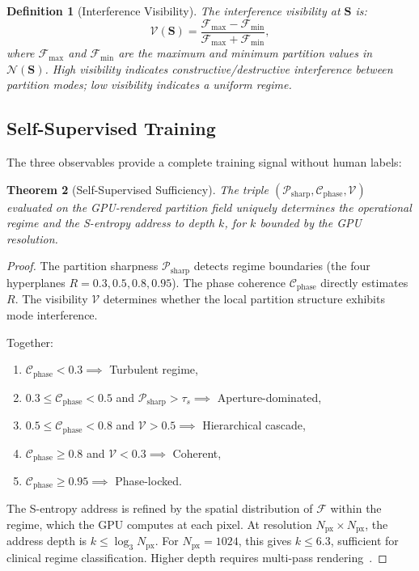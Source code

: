 \documentclass[aps,prd,twocolumn,superscriptaddress,floatfix,nofootinbib]{revtex4-2}
\newtheorem{theorem}{Theorem}[section]
\newtheorem{definition}[theorem]{Definition}
\theoremstyle{remark}
\newcommand{\Svec}{\mathbf{S}}
\begin{document}
\begin{definition}[Interference Visibility]
\label{def:visibility}
The interference visibility at $\Svec$ is:
\begin{equation}
\mathcal{V}(\Svec) = \frac{\mathcal{F}_{\max} - \mathcal{F}_{\min}}{\mathcal{F}_{\max} + \mathcal{F}_{\min}},
\label{eq:visibility}
\end{equation}
where $\mathcal{F}_{\max}$ and $\mathcal{F}_{\min}$ are the maximum and minimum partition values in $\mathcal{N}(\Svec)$.
High visibility indicates constructive/destructive interference between partition modes; low visibility indicates a uniform regime.
\end{definition}

\subsection{Self-Supervised Training}

The three observables provide a complete training signal without human labels:

\begin{theorem}[Self-Supervised Sufficiency]
\label{thm:self_supervised}
The triple $(\mathcal{P}_{\mathrm{sharp}}, \mathcal{C}_{\mathrm{phase}}, \mathcal{V})$ evaluated on the GPU-rendered partition field uniquely determines the operational regime and the S-entropy address to depth $k$, for $k$ bounded by the GPU resolution.
\end{theorem}

\begin{proof}
The partition sharpness $\mathcal{P}_{\mathrm{sharp}}$ detects regime boundaries (the four hyperplanes $R = 0.3, 0.5, 0.8, 0.95$).
The phase coherence $\mathcal{C}_{\mathrm{phase}}$ directly estimates $R$.
The visibility $\mathcal{V}$ determines whether the local partition structure exhibits mode interference.

Together:
\begin{enumerate}[noitemsep]
    \item $\mathcal{C}_{\mathrm{phase}} < 0.3 \implies$ Turbulent regime,
    \item $0.3 \leq \mathcal{C}_{\mathrm{phase}} < 0.5$ and $\mathcal{P}_{\mathrm{sharp}} > \tau_s \implies$ Aperture-dominated,
    \item $0.5 \leq \mathcal{C}_{\mathrm{phase}} < 0.8$ and $\mathcal{V} > 0.5 \implies$ Hierarchical cascade,
    \item $\mathcal{C}_{\mathrm{phase}} \geq 0.8$ and $\mathcal{V} < 0.3 \implies$ Coherent,
    \item $\mathcal{C}_{\mathrm{phase}} \geq 0.95 \implies$ Phase-locked.
\end{enumerate}
The S-entropy address is refined by the spatial distribution of $\mathcal{F}$ within the regime, which the GPU computes at each pixel.
At resolution $N_{\mathrm{px}} \times N_{\mathrm{px}}$, the address depth is $k \leq \log_3 N_{\mathrm{px}}$.
For $N_{\mathrm{px}} = 1024$, this gives $k \leq 6.3$, sufficient for clinical regime classification.
Higher depth requires multi-pass rendering~\cite{sachikonye2026gpu}.
\end{proof}
\end{document}
